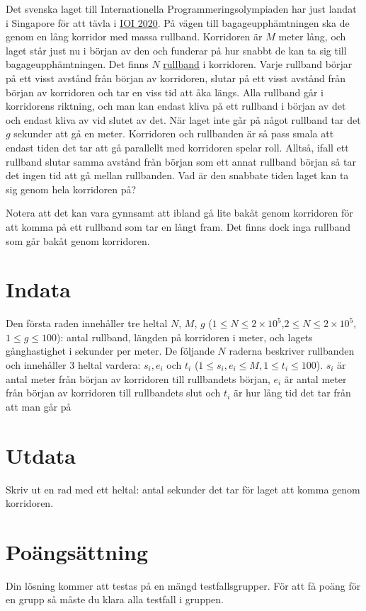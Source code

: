Det svenska laget till Internationella Programmeringsolympiaden har just landat i Singapore för att
tävla i \href{https://ioi2020.sg/}{IOI 2020}.
På vägen till bagageupphämtningen ska de genom en lång korridor med massa rullband.
Korridoren är $M$ meter lång, och laget står just nu i början av den och funderar på
hur snabbt de kan ta sig till bagageupphämtningen.
Det finns $N$ \href{https://sv.wikipedia.org/wiki/Rullande_trottoar}{rullband} i korridoren.
Varje rullband börjar på ett visst avstånd från början av korridoren,
slutar på ett visst avstånd från början av korridoren och tar en viss tid att åka längs.
Alla rullband går i korridorens riktning, och man kan endast kliva på ett rullband i början av det och endast kliva av vid slutet av det.
När laget inte går på något rullband tar det $g$ sekunder att gå en meter.
Korridoren och rullbanden är så pass smala att endast tiden det tar att gå
parallellt med korridoren spelar roll. 
Alltså, ifall ett rullband slutar samma avstånd från början
som ett annat rullband början så tar det ingen tid att gå mellan
rullbanden. Vad är den snabbate tiden laget kan ta sig genom hela korridoren på?

Notera att det kan vara gynnsamt att ibland gå lite bakåt genom korridoren för att komma på
ett rullband som tar en långt fram. Det finns dock inga rullband som går bakåt genom
korridoren.

\section*{Indata}
Den första raden innehåller tre heltal $N$, $M$, $g$ ($1 \le N \le 2 \times 10^5$,$2 \le N \le 2 \times 10^5$, $1 \le g \le 100$):
antal rullband, längden på korridoren i meter, och lagets gånghastighet i sekunder per meter.
De följande $N$ raderna beskriver rullbanden och innehåller 3 heltal vardera: $s_i, e_i$ och $t_i$
($1\leq s_i,e_i\leq M,1\leq t_i\leq100$).
$s_i$ är antal meter från början av korridoren till rullbandets början, $e_i$ är antal meter
från början av korridoren till rullbandets slut och $t_i$ är hur lång tid det tar från att man går på

\section*{Utdata}
Skriv ut en rad med ett heltal: antal sekunder det tar för laget att komma genom korridoren.

\section*{Poängsättning}
Din lösning kommer att testas på en mängd testfallsgrupper.
För att få poäng för en grupp så måste du klara alla testfall i gruppen.

